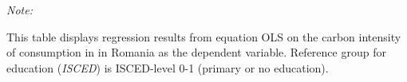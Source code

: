 \begin{table}[htbp!]
\begin{adjustbox}{width = 1\textwidth, max height = 0.95\textheight, center}
\begin{threeparttable}[b]
         \begin{tablenotes}\item \medskip \textit{Note:}
            \item This table displays regression results from equation OLS on the carbon intensity of consumption in  in Romania as the dependent variable. Reference group for education (\textit{ISCED}) is ISCED-level 0-1 (primary or no education).
         \end{tablenotes}
      \end{threeparttable}
   \end{adjustbox}
\end{table}


